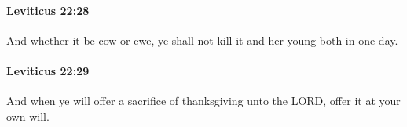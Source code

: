 		\paragraph{Leviticus 22:28} %
			\label{LEVITICUS-22-28}

			And whether it be cow or ewe, ye shall not kill it and her young both in one day.


		\paragraph{Leviticus 22:29} %
			\label{LEVITICUS-22-29}

			And when ye will offer a sacrifice of thanksgiving unto the LORD, offer it at your own will.


